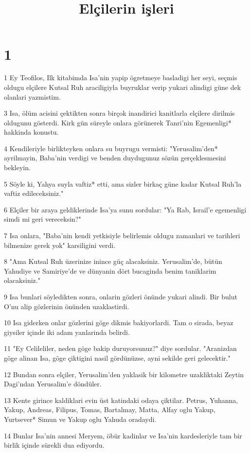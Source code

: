 

\title{Elçilerin işleri}


\chapter{1}

\par 1 Ey Teofilos, Ilk kitabimda Isa'nin yapip ögretmeye basladigi her seyi, seçmis oldugu elçilere Kutsal Ruh araciligiyla buyruklar verip yukari alindigi güne dek olanlari yazmistim.
\par 3 Isa, ölüm acisini çektikten sonra birçok inandirici kanitlarla elçilere dirilmis oldugunu gösterdi. Kirk gün süreyle onlara görünerek Tanri'nin Egemenligi* hakkinda konustu.
\par 4 Kendileriyle birlikteyken onlara su buyrugu vermisti: "Yerusalim'den* ayrilmayin, Baba'nin verdigi ve benden duydugunuz sözün gerçeklesmesini bekleyin.
\par 5 Söyle ki, Yahya suyla vaftiz* etti, ama sizler birkaç güne kadar Kutsal Ruh'la vaftiz edileceksiniz."
\par 6 Elçiler bir araya geldiklerinde Isa'ya sunu sordular: "Ya Rab, Israil'e egemenligi simdi mi geri vereceksin?"
\par 7 Isa onlara, "Baba'nin kendi yetkisiyle belirlemis oldugu zamanlari ve tarihleri bilmenize gerek yok" karsiligini verdi.
\par 8 "Ama Kutsal Ruh üzerinize inince güç alacaksiniz. Yerusalim'de, bütün Yahudiye ve Samiriye'de ve dünyanin dört bucaginda benim taniklarim olacaksiniz."
\par 9 Isa bunlari söyledikten sonra, onlarin gözleri önünde yukari alindi. Bir bulut O'nu alip gözlerinin önünden uzaklastirdi.
\par 10 Isa giderken onlar gözlerini göge dikmis bakiyorlardi. Tam o sirada, beyaz giysiler içinde iki adam yanlarinda belirdi.
\par 11 "Ey Celileliler, neden göge bakip duruyorsunuz?" diye sordular. "Aranizdan göge alinan Isa, göge çiktigini nasil gördünüzse, ayni sekilde geri gelecektir."
\par 12 Bundan sonra elçiler, Yerusalim'den yaklasik bir kilometre uzakliktaki Zeytin Dagi'ndan Yerusalim'e döndüler.
\par 13 Kente girince kaldiklari evin üst katindaki odaya çiktilar. Petrus, Yuhanna, Yakup, Andreas, Filipus, Tomas, Bartalmay, Matta, Alfay oglu Yakup, Yurtsever* Simun ve Yakup oglu Yahuda oradaydi.
\par 14 Bunlar Isa'nin annesi Meryem, öbür kadinlar ve Isa'nin kardesleriyle tam bir birlik içinde sürekli dua ediyordu.
